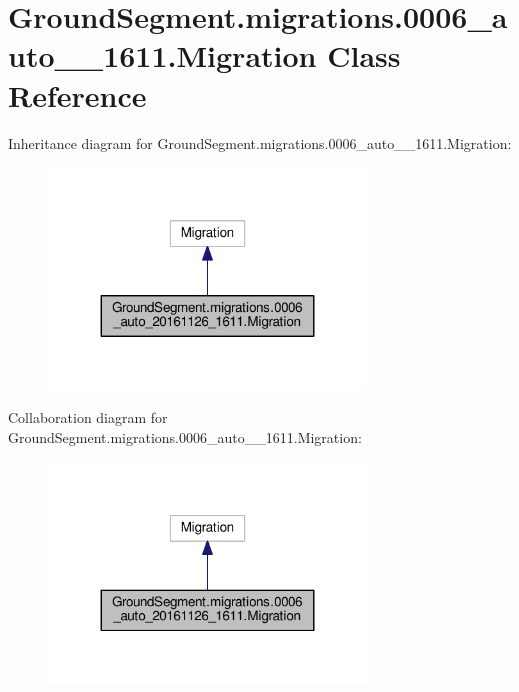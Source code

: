 \hypertarget{class_ground_segment_1_1migrations_1_10006__auto__20161126__1611_1_1_migration}{}\section{Ground\+Segment.\+migrations.0006\+\_\+auto\+\_\+\_\+1611.Migration Class Reference}
\label{class_ground_segment_1_1migrations_1_10006__auto__20161126__1611_1_1_migration}


Inheritance diagram for Ground\+Segment.\+migrations.0006\+\_\+auto\+\_\+\_\+1611.Migration\+:\nopagebreak
\begin{figure}[H]
\begin{center}
\leavevmode
\includegraphics[width=239pt]{class_ground_segment_1_1migrations_1_10006__auto__20161126__1611_1_1_migration__inherit__graph}
\end{center}
\end{figure}


Collaboration diagram for Ground\+Segment.\+migrations.0006\+\_\+auto\+\_\+\_\+1611.Migration\+:\nopagebreak
\begin{figure}[H]
\begin{center}
\leavevmode
\includegraphics[width=239pt]{class_ground_segment_1_1migrations_1_10006__auto__20161126__1611_1_1_migration__coll__graph}
\end{center}
\end{figure}
